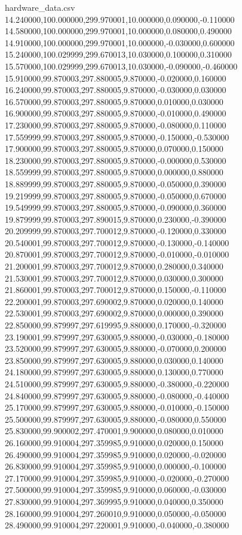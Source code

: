 \begin{filecontents}{hardware_data.csv}
14.240000,100.000000,299.970001,10.000000,0.090000,-0.110000
14.580000,100.000000,299.970001,10.000000,0.080000,0.490000
14.910000,100.000000,299.970001,10.000000,-0.030000,0.600000
15.240000,100.029999,299.670013,10.030000,0.100000,0.310000
15.570000,100.029999,299.670013,10.030000,-0.090000,-0.460000
15.910000,99.870003,297.880005,9.870000,-0.020000,0.160000
16.240000,99.870003,297.880005,9.870000,-0.030000,0.030000
16.570000,99.870003,297.880005,9.870000,0.010000,0.030000
16.900000,99.870003,297.880005,9.870000,-0.010000,0.490000
17.230000,99.870003,297.880005,9.870000,-0.080000,0.110000
17.559999,99.870003,297.880005,9.870000,-0.150000,-0.530000
17.900000,99.870003,297.880005,9.870000,0.070000,0.150000
18.230000,99.870003,297.880005,9.870000,-0.000000,0.530000
18.559999,99.870003,297.880005,9.870000,0.000000,0.880000
18.889999,99.870003,297.880005,9.870000,-0.050000,0.390000
19.219999,99.870003,297.880005,9.870000,-0.050000,0.670000
19.549999,99.870003,297.880005,9.870000,-0.090000,0.360000
19.879999,99.870003,297.890015,9.870000,0.230000,-0.390000
20.209999,99.870003,297.700012,9.870000,-0.120000,0.330000
20.540001,99.870003,297.700012,9.870000,-0.130000,-0.140000
20.870001,99.870003,297.700012,9.870000,-0.010000,-0.010000
21.200001,99.870003,297.700012,9.870000,0.280000,0.340000
21.530001,99.870003,297.700012,9.870000,0.030000,0.300000
21.860001,99.870003,297.700012,9.870000,0.150000,-0.110000
22.200001,99.870003,297.690002,9.870000,0.020000,0.140000
22.530001,99.870003,297.690002,9.870000,0.000000,0.390000
22.850000,99.879997,297.619995,9.880000,0.170000,-0.320000
23.190001,99.879997,297.630005,9.880000,-0.030000,-0.180000
23.520000,99.879997,297.630005,9.880000,-0.070000,0.200000
23.850000,99.879997,297.630005,9.880000,0.030000,0.140000
24.180000,99.879997,297.630005,9.880000,0.130000,0.770000
24.510000,99.879997,297.630005,9.880000,-0.380000,-0.220000
24.840000,99.879997,297.630005,9.880000,-0.080000,-0.440000
25.170000,99.879997,297.630005,9.880000,-0.010000,-0.150000
25.500000,99.879997,297.630005,9.880000,-0.080000,0.550000
25.830000,99.900002,297.470001,9.900000,0.080000,0.010000
26.160000,99.910004,297.359985,9.910000,0.020000,0.150000
26.490000,99.910004,297.359985,9.910000,0.020000,-0.020000
26.830000,99.910004,297.359985,9.910000,0.000000,-0.100000
27.170000,99.910004,297.359985,9.910000,-0.020000,-0.270000
27.500000,99.910004,297.359985,9.910000,0.060000,-0.030000
27.830000,99.910004,297.369995,9.910000,0.040000,0.350000
28.160000,99.910004,297.260010,9.910000,0.050000,-0.050000
28.490000,99.910004,297.220001,9.910000,-0.040000,-0.380000

\end{filecontents}
